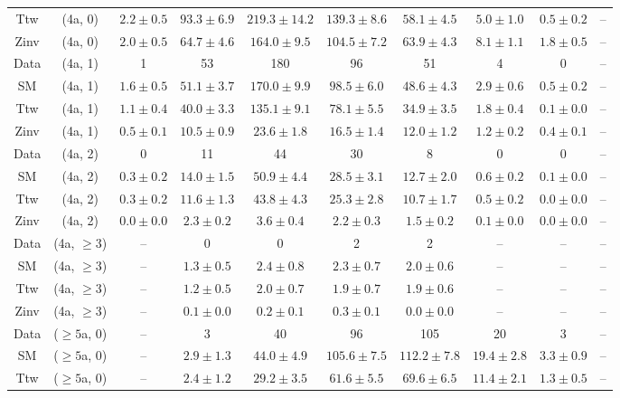 \begin{table}[h!]
{\begin{tabular}{cccccccccc}
	Ttw & (4a, 0) & $2.2\pm 0.5$ & $93.3\pm 6.9$ & $219.3\pm 14.2$ & $139.3\pm 8.6$ & $58.1\pm 4.5$ & $5.0\pm 1.0$ & $0.5\pm 0.2$ & -- \\[0.5ex] 
	Zinv & (4a, 0) & $2.0\pm 0.5$ & $64.7\pm 4.6$ & $164.0\pm 9.5$ & $104.5\pm 7.2$ & $63.9\pm 4.3$ & $8.1\pm 1.1$ & $1.8\pm 0.5$ & -- \\[0.5ex] 
	Data & (4a, 1) & 1 & 53 & 180 & 96 & 51 & 4 & 0 & -- \\[0.5ex] 
	SM & (4a, 1) & $1.6\pm 0.5$ & $51.1\pm 3.7$ & $170.0\pm 9.9$ & $98.5\pm 6.0$ & $48.6\pm 4.3$ & $2.9\pm 0.6$ & $0.5\pm 0.2$ & -- \\[0.5ex] 
	Ttw & (4a, 1) & $1.1\pm 0.4$ & $40.0\pm 3.3$ & $135.1\pm 9.1$ & $78.1\pm 5.5$ & $34.9\pm 3.5$ & $1.8\pm 0.4$ & $0.1\pm 0.0$ & -- \\[0.5ex] 
	Zinv & (4a, 1) & $0.5\pm 0.1$ & $10.5\pm 0.9$ & $23.6\pm 1.8$ & $16.5\pm 1.4$ & $12.0\pm 1.2$ & $1.2\pm 0.2$ & $0.4\pm 0.1$ & -- \\[0.5ex] 
	Data & (4a, 2) & 0 & 11 & 44 & 30 & 8 & 0 & 0 & -- \\[0.5ex] 
	SM & (4a, 2) & $0.3\pm 0.2$ & $14.0\pm 1.5$ & $50.9\pm 4.4$ & $28.5\pm 3.1$ & $12.7\pm 2.0$ & $0.6\pm 0.2$ & $0.1\pm 0.0$ & -- \\[0.5ex] 
	Ttw & (4a, 2) & $0.3\pm 0.2$ & $11.6\pm 1.3$ & $43.8\pm 4.3$ & $25.3\pm 2.8$ & $10.7\pm 1.7$ & $0.5\pm 0.2$ & $0.0\pm 0.0$ & -- \\[0.5ex] 
	Zinv & (4a, 2) & $0.0\pm 0.0$ & $2.3\pm 0.2$ & $3.6\pm 0.4$ & $2.2\pm 0.3$ & $1.5\pm 0.2$ & $0.1\pm 0.0$ & $0.0\pm 0.0$ & -- \\[0.5ex] 
	Data & (4a, $\ge3$) & -- & 0 & 0 & 2 & 2 & -- & -- & -- \\[0.5ex] 
	SM & (4a, $\ge3$) & -- & $1.3\pm 0.5$ & $2.4\pm 0.8$ & $2.3\pm 0.7$ & $2.0\pm 0.6$ & -- & -- & -- \\[0.5ex] 
	Ttw & (4a, $\ge3$) & -- & $1.2\pm 0.5$ & $2.0\pm 0.7$ & $1.9\pm 0.7$ & $1.9\pm 0.6$ & -- & -- & -- \\[0.5ex] 
	Zinv & (4a, $\ge3$) & -- & $0.1\pm 0.0$ & $0.2\pm 0.1$ & $0.3\pm 0.1$ & $0.0\pm 0.0$ & -- & -- & -- \\[0.5ex] 
	Data & ($\ge5$a, 0) & -- & 3 & 40 & 96 & 105 & 20 & 3 & -- \\[0.5ex] 
	SM & ($\ge5$a, 0) & -- & $2.9\pm 1.3$ & $44.0\pm 4.9$ & $105.6\pm 7.5$ & $112.2\pm 7.8$ & $19.4\pm 2.8$ & $3.3\pm 0.9$ & -- \\[0.5ex] 
	Ttw & ($\ge5$a, 0) & -- & $2.4\pm 1.2$ & $29.2\pm 3.5$ & $61.6\pm 5.5$ & $69.6\pm 6.5$ & $11.4\pm 2.1$ & $1.3\pm 0.5$ & -- \\[0.5ex] 

\end{tabular}}
\end{table}

